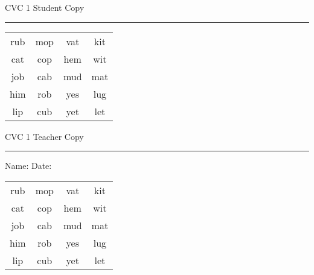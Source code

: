 \documentclass{memoir}
\begin{document}

\footnotesize \noindent
CVC 1 \hfill Student Copy
\smallskip
\hrule

\Large

\setlength{\tabcolsep}{14pt}
\def\arraystretch{2}

{\selectfont


\begin{vplace}[0.5]
\begin{center}
\begin{tabular}{cccc}
rub & mop & vat & kit \\
cat & cop & hem & wit \\
job & cab & mud & mat \\
him & rob & yes & lug \\
lip & cub & yet & let \\
\end{tabular}
\end{center}
\end{vplace}

}

\newpage

\footnotesize \noindent
CVC 1 \hfill Teacher Copy
\smallskip
\hrule

\small

\vfill

\noindent
Name: \underline{\hspace{1.75in}} \hfill Date: \underline{\hspace{1in}}

\Large

{\selectfont


\begin{vplace}[0.5]
\begin{center}
\begin{tabular}{cccc}
rub & mop & vat & kit \\
cat & cop & hem & wit \\
job & cab & mud & mat \\
him & rob & yes & lug \\
lip & cub & yet & let \\
\end{tabular}
\end{center}
\end{vplace}



}
\end{document}
